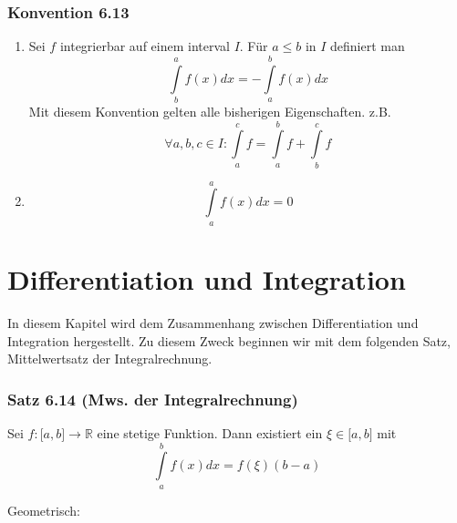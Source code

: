 \subsubsection*{Konvention 6.13}
\begin{enumerate}[\indent 1)]
\item Sei $f$ integrierbar auf einem interval $I$. Für $a\leq b$ in $I$ definiert man \[\int\limits_b^a {f(x)dx =  - \int\limits_a^b {f(x)dx} } \]
Mit diesem Konvention gelten alle bisherigen Eigenschaften. z.B. \[\forall a,b,c \in I:\int\limits_a^c f  = \int\limits_a^b f  + \int\limits_b^c f \]
\item \[\int\limits_a^a {f(x)dx = 0} \]
\end{enumerate}
\section{Differentiation und Integration}
In diesem Kapitel wird dem Zusammenhang zwischen Differentiation und Integration hergestellt. Zu diesem Zweck beginnen wir mit dem folgenden Satz, Mittelwertsatz der Integralrechnung. \\

\subsubsection*{Satz 6.14 (Mws. der Integralrechnung)}
Sei $f:\lbrack a,b\rbrack\rightarrow\mathbb{R}$ eine stetige Funktion. Dann existiert ein $\xi\in\lbrack a,b\rbrack$ mit \[\int\limits_a^b {f(x)dx = f(\xi )(b - a)} \] 

Geometrisch:

